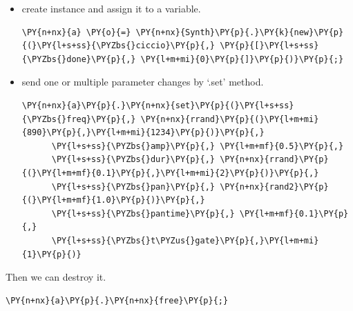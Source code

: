 \begin{itemize}
\tightlist
\item create instance and assign it to a variable.
    \begin{tcolorbox}[breakable, size=fbox, boxrule=1pt, pad at break*=1mm,colback=cellbackground, colframe=cellborder]
\begin{Verbatim}[commandchars=\\\{\}]
\PY{n+nx}{a} \PY{o}{=} \PY{n+nx}{Synth}\PY{p}{.}\PY{k}{new}\PY{p}{(}\PY{l+s+ss}{\PYZbs{}ciccio}\PY{p}{,} \PY{p}{[}\PY{l+s+ss}{\PYZbs{}done}\PY{p}{,} \PY{l+m+mi}{0}\PY{p}{]}\PY{p}{)}\PY{p}{;}
\end{Verbatim}
\end{tcolorbox}

\pagebreak
\item send one or multiple parameter changes by `.set' method.
    \begin{tcolorbox}[breakable, size=fbox, boxrule=1pt, pad at break*=1mm,colback=cellbackground, colframe=cellborder]
\begin{Verbatim}[commandchars=\\\{\}]
\PY{n+nx}{a}\PY{p}{.}\PY{n+nx}{set}\PY{p}{(}\PY{l+s+ss}{\PYZbs{}freq}\PY{p}{,} \PY{n+nx}{rrand}\PY{p}{(}\PY{l+m+mi}{890}\PY{p}{,}\PY{l+m+mi}{1234}\PY{p}{)}\PY{p}{,} 
      \PY{l+s+ss}{\PYZbs{}amp}\PY{p}{,} \PY{l+m+mf}{0.5}\PY{p}{,} 
      \PY{l+s+ss}{\PYZbs{}dur}\PY{p}{,} \PY{n+nx}{rrand}\PY{p}{(}\PY{l+m+mf}{0.1}\PY{p}{,}\PY{l+m+mi}{2}\PY{p}{)}\PY{p}{,} 
      \PY{l+s+ss}{\PYZbs{}pan}\PY{p}{,} \PY{n+nx}{rand2}\PY{p}{(}\PY{l+m+mf}{1.0}\PY{p}{)}\PY{p}{,} 
      \PY{l+s+ss}{\PYZbs{}pantime}\PY{p}{,} \PY{l+m+mf}{0.1}\PY{p}{,} 
      \PY{l+s+ss}{\PYZbs{}t\PYZus{}gate}\PY{p}{,}\PY{l+m+mi}{1}\PY{p}{)}
\end{Verbatim}
\end{tcolorbox}
\end{itemize}

Then we can destroy it.

    \begin{tcolorbox}[breakable, size=fbox, boxrule=1pt, pad at break*=1mm,colback=cellbackground, colframe=cellborder]
\begin{Verbatim}[commandchars=\\\{\}]
\PY{n+nx}{a}\PY{p}{.}\PY{n+nx}{free}\PY{p}{;}
\end{Verbatim}
\end{tcolorbox}

